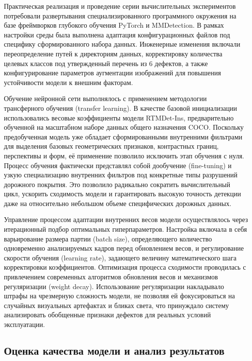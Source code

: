 \documentclass[a4paper,12pt]{article}
\begin{document}
Практическая реализация и проведение серии вычислительных экспериментов потребовали развертывания специализированного программного окружения на базе фреймворков глубокого обучения PyTorch и MMDetection. В рамках настройки среды была выполнена адаптация конфигурационных файлов под специфику сформированного набора данных. Инженерные изменения включали переопределение путей к директориям данных, корректировку количества целевых классов под утвержденный перечень из 6 дефектов, а также конфигурирование параметров аугментации изображений для повышения устойчивости модели к внешним факторам.

Обучение нейронной сети выполнялось с применением методологии трансферного обучения (transfer learning). В качестве базовой инициализации использовались весовые коэффициенты модели RTMDet-Ins, предварительно обученной на масштабном наборе данных общего назначения COCO. \cite{lin_coco} Поскольку предобученная модель уже обладает сформированными внутренними фильтрами для выделения базовых геометрических признаков, контрастных границ, перспективы и форм, её применение позволило исключить этап обучения с нуля. Процесс обучения фактически представлял собой дообучение (fine-tuning) и узкую специализацию внутренних фильтров под конкретные типы разрушений дорожного покрытия. Это позволило радикально сократить вычислительный цикл, ускорить сходимость модели и гарантировать высокую точность детекции даже на относительно небольшом объеме специфических дорожных данных.

Управление процессом адаптации внутренних весов модели осуществлялось через итерационный подбор оптимальных гиперпараметров. Настройка включала в себя варьирование размера партии (batch size), определяющего количество одновременно анализируемых кадров перед обновлением весов, и регулирование скорости обучения (learning rate), задающего величину математического шага корректировки коэффициентов. Оптимизация процесса сходимости проводилась с привлечением современных алгоритмов обновления весов и механизмов регуляризации (weight decay). Использование регуляризации накладывало штрафы на чрезмерную сложность модели, не позволяя ей фокусироваться на случайных визуальных артефактах и бликах света, что принуждало систему анализировать обобщенные признаки дефектов для реальных условий эксплуатации.

\subsection{Оценка качества модели и анализ результатов}
\end{document}
